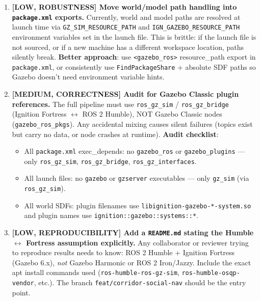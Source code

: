 \documentclass[11pt]{article}
\begin{document}
\begin{enumerate}
  \item \textbf{[LOW, ROBUSTNESS] Move world/model path handling into
    \texttt{package.xml} exports.} Currently, world and model paths are resolved
    at launch time via \texttt{GZ\_SIM\_RESOURCE\_PATH} and
    \texttt{IGN\_GAZEBO\_RESOURCE\_PATH} environment variables set in the launch
    file. This is brittle: if the launch file is not sourced, or if a new machine
    has a different workspace location, paths silently break.
    \textbf{Better approach}: use \texttt{<gazebo\_ros>} resource\_path export in
    \texttt{package.xml}, or consistently use \texttt{FindPackageShare} + absolute
    SDF paths so Gazebo doesn't need environment variable hints.

  \item \textbf{[MEDIUM, CORRECTNESS] Audit for Gazebo Classic plugin references.}
    The full pipeline must use \texttt{ros\_gz\_sim} / \texttt{ros\_gz\_bridge}
    (Ignition Fortress $\leftrightarrow$ ROS 2 Humble), NOT Gazebo Classic nodes
    (\texttt{gazebo\_ros\_pkgs}). Any accidental mixing causes silent failures
    (topics exist but carry no data, or node crashes at runtime).
    \textbf{Audit checklist}:
    \begin{itemize}
      \item All \texttt{package.xml} exec\_depends: no \texttt{gazebo\_ros} or
        \texttt{gazebo\_plugins} --- only \texttt{ros\_gz\_sim},
        \texttt{ros\_gz\_bridge}, \texttt{ros\_gz\_interfaces}.
      \item All launch files: no \texttt{gazebo} or \texttt{gzserver} executables ---
        only \texttt{gz\_sim} (via \texttt{ros\_gz\_sim}).
      \item All world SDFs: plugin filenames use \texttt{libignition-gazebo-*-system.so}
        and plugin names use \texttt{ignition::gazebo::systems::*}.
    \end{itemize}

  \item \textbf{[LOW, REPRODUCIBILITY] Add a \texttt{README.md} stating the
    Humble $\leftrightarrow$ Fortress assumption explicitly.}
    Any collaborator or reviewer trying to reproduce results needs to know:
    ROS 2 Humble + Ignition Fortress (Gazebo 6.x), \emph{not} Gazebo Harmonic
    or ROS 2 Iron/Jazzy. Include the exact apt install commands used
    (\texttt{ros-humble-ros-gz-sim}, \texttt{ros-humble-osqp-vendor}, etc.).
    The branch \texttt{feat/corridor-social-nav} should be the entry point.
\end{enumerate}
\end{document}
